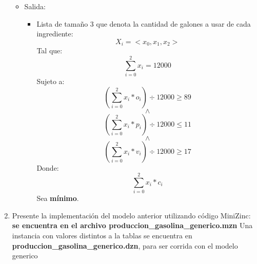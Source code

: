 \documentclass[12pt]{article}
\begin{document}
\begin{enumerate}[label=\alph*]
\begin{justify}
\begin{itemize}
\begin{itemize}
\end{itemize}
\item Salida:
\begin{itemize}
\item Lista de tamaño 3 que denota la cantidad de galones a usar de cada ingrediente:
\begin{equation*}
X_{i} = <x_{0}, x_{1}, x_{2}>
\end{equation*}
Tal que:
\begin{equation*}
\sum_{i = 0}^{2} x_{i} = 12000
\end{equation*}
Sujeto a:
\begin{equation*}
(\sum_{i = 0}^{2} x_{i} * o_{i}) \div 12000 \geq 89
\end{equation*}
\begin{equation*}
\land
\end{equation*}
\begin{equation*}
(\sum_{i = 0}^{2} x_{i} * p_{i}) \div 12000 \leq 11
\end{equation*}
\begin{equation*}
\land
\end{equation*}
\begin{equation*}
(\sum_{i = 0}^{2} x_{i} * v_{i}) \div 12000 \geq 17
\end{equation*}
Donde:
\begin{equation*}
\sum_{i = 0}^{2} x_{i} * c_{i}
\end{equation*}
Sea \textbf{mínimo}.
\end{itemize}
\end{itemize}
\end{justify}
\item Presente la implementación del modelo anterior utilizando código MiniZinc: \textbf{se encuentra en el archivo produccion\_gasolina\_generico.mzn}
Una instancia con valores distintos a la tablas se encuentra en \textbf{produccion\_gasolina\_generico.dzn}, para ser corrida con el modelo generico
\end{enumerate}
\end{document}
